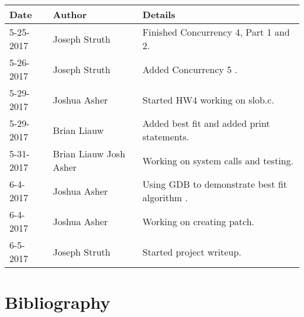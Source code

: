 \documentclass[10pt,draftclsnofoot,onecolumn, compsoc]{IEEEtran}
\begin{document}
\begin{tabular}{| l | l | p{15cm} |}\textbf{Date} & \textbf{Author} & \textbf{Details}\\\hline
5-25-2017 & Joseph Struth & Finished Concurrency 4, Part 1 and 2.\\\hline
5-26-2017 & Joseph Struth & Added Concurrency 5 .\\\hline
5-29-2017 & Joshua Asher & Started HW4 working on slob.c.\\\hline
5-29-2017 & Brian Liauw & Added best fit and added print statements.\\\hline
5-31-2017 & Brian Liauw Josh Asher & Working on system calls and testing.\\\hline
6-4-2017 & Joshua Asher & Using GDB to demonstrate best fit algorithm .\\\hline
6-4-2017 & Joshua Asher & Working on creating patch.\\\hline
6-5-2017 & Joseph Struth & Started project writeup.\\\hline
\end{tabular}

\section{Bibliography}
\nocite{*}


\end{document}
